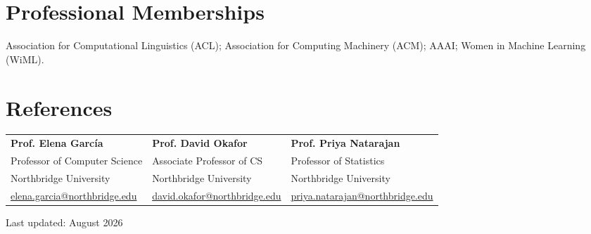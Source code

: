 \documentclass[10pt,letterpaper]{article}
\begin{document}
\section*{Professional Memberships}
Association for Computational Linguistics (ACL); Association for Computing Machinery (ACM);
AAAI; Women in Machine Learning (WiML).

\section*{References}
\begin{tabularx}{\textwidth}{@{}X X X@{}}
\textbf{Prof. Elena García} & \textbf{Prof. David Okafor} & \textbf{Prof. Priya Natarajan}\\
Professor of Computer Science & Associate Professor of CS & Professor of Statistics\\
Northbridge University & Northbridge University & Northbridge University\\
\href{mailto:elena.garcia@northbridge.edu}{elena.garcia@northbridge.edu} &
\href{mailto:david.okafor@northbridge.edu}{david.okafor@northbridge.edu} &
\href{mailto:priya.natarajan@northbridge.edu}{priya.natarajan@northbridge.edu}
\end{tabularx}

\vfill
\begin{center}
  \footnotesize\color{muted}Last updated: August 2026
\end{center}
\end{document}
